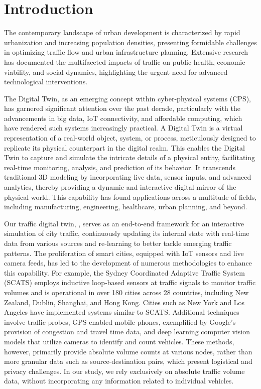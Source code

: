 \section{Introduction}

The contemporary landscape of urban development is characterized by rapid urbanization and increasing population densities, presenting formidable challenges in optimizing traffic flow and urban infrastructure planning. Extensive research has documented the multifaceted impacts of traffic on public health\cite{levy2010evaluation}, economic viability\cite{gorea2016financial}, and social dynamics\cite{anciaes2017social}, highlighting the urgent need for advanced technological interventions.


The Digital Twin, as an emerging concept within cyber-physical systems (CPS), has garnered significant attention over the past decade, particularly with the advancements in big data, IoT connectivity, and affordable computing, which have rendered such systems increasingly practical\cite{guo2017mobile}\cite{singh2021digital}. A Digital Twin is a virtual representation of a real-world object, system, or process, meticulously designed to replicate its physical counterpart in the digital realm\cite{VANDERHORN2021113524}. This enables the Digital Twin to capture and simulate the intricate details of a physical entity, facilitating real-time monitoring, analysis, and prediction of its behavior. It transcends traditional 3D modeling by incorporating live data, sensor inputs, and advanced analytics, thereby providing a dynamic and interactive digital mirror of the physical world\cite{VANDERHORN2021113524}. This capability has found applications across a multitude of fields, including manufacturing, engineering, healthcare, urban planning, and beyond.

Our traffic digital twin, \name, serves as an end-to-end framework for an interactive simulation of city traffic, continuously updating its internal state with real-time data from various sources and re-learning to better tackle emerging traffic patterns. The proliferation of smart cities, equipped with IoT sensors and live camera feeds, has led to the development of numerous methodologies to enhance this capability. For example, the Sydney Coordinated Adaptive Traffic System (SCATS)\cite{scats} employs inductive loop-based sensors at traffic signals to monitor traffic volumes and is operational in over 180 cities across 28 countries, including New Zealand, Dublin, Shanghai, and Hong Kong\cite{wiki:sydney_traffic_system}. Cities such as New York and Los Angeles have implemented systems similar to SCATS. Additional techniques involve traffic probes\cite{zhu2012probe}, GPS-enabled mobile phones\cite{rose2006mobile}, exemplified by Google’s provision of congestion and travel time data, and deep learning computer vision models that utilize cameras to identify and count vehicles. These methods, however, primarily provide absolute volume counts at various nodes, rather than more granular data such as source-destination pairs, which present logistical and privacy challenges. In our study, we rely exclusively on absolute traffic volume data, without incorporating any information related to individual vehicles.

